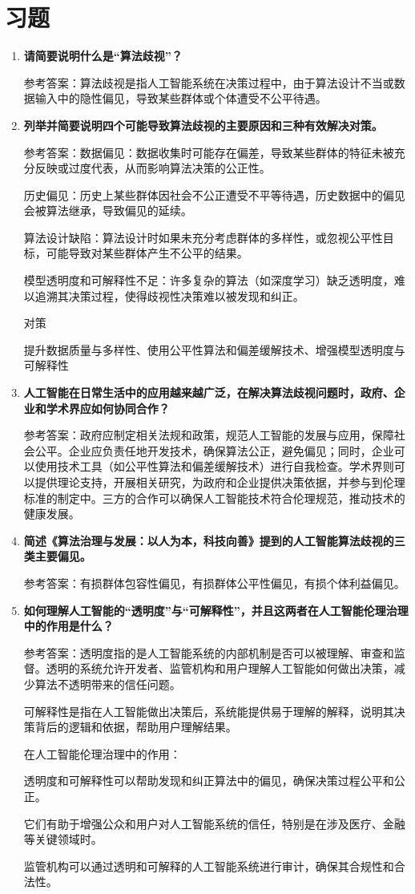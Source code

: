 \section*{习题}
\begin{enumerate}
\item \textbf{请简要说明什么是“算法歧视”？}

参考答案：算法歧视是指人工智能系统在决策过程中，由于算法设计不当或数据输入中的隐性偏见，导致某些群体或个体遭受不公平待遇。

\item \textbf{列举并简要说明四个可能导致算法歧视的主要原因和三种有效解决对策。}

参考答案：数据偏见：数据收集时可能存在偏差，导致某些群体的特征未被充分反映或过度代表，从而影响算法决策的公正性。

历史偏见：历史上某些群体因社会不公正遭受不平等待遇，历史数据中的偏见会被算法继承，导致偏见的延续。

算法设计缺陷：算法设计时如果未充分考虑群体的多样性，或忽视公平性目标，可能导致对某些群体产生不公平的结果。

模型透明度和可解释性不足：许多复杂的算法（如深度学习）缺乏透明度，难以追溯其决策过程，使得歧视性决策难以被发现和纠正。

对策

提升数据质量与多样性、使用公平性算法和偏差缓解技术、增强模型透明度与可解释性

\item \textbf{人工智能在日常生活中的应用越来越广泛，在解决算法歧视问题时，政府、企业和学术界应如何协同合作？}

参考答案：政府应制定相关法规和政策，规范人工智能的发展与应用，保障社会公平。企业应负责任地开发技术，确保算法公正，避免偏见；同时，企业可以使用技术工具（如公平性算法和偏差缓解技术）进行自我检查。学术界则可以提供理论支持，开展相关研究，为政府和企业提供决策依据，并参与到伦理标准的制定中。三方的合作可以确保人工智能技术符合伦理规范，推动技术的健康发展。

\item \textbf{简述《算法治理与发展：以人为本，科技向善》提到的人工智能算法歧视的三类主要偏见。}

参考答案：有损群体包容性偏见，有损群体公平性偏见，有损个体利益偏见。

\item \textbf{如何理解人工智能的“透明度”与“可解释性”，并且这两者在人工智能伦理治理中的作用是什么？}

参考答案：透明度指的是人工智能系统的内部机制是否可以被理解、审查和监督。透明的系统允许开发者、监管机构和用户理解人工智能如何做出决策，减少算法不透明带来的信任问题。

可解释性是指在人工智能做出决策后，系统能提供易于理解的解释，说明其决策背后的逻辑和依据，帮助用户理解结果。

在人工智能伦理治理中的作用：

透明度和可解释性可以帮助发现和纠正算法中的偏见，确保决策过程公平和公正。

它们有助于增强公众和用户对人工智能系统的信任，特别是在涉及医疗、金融等关键领域时。

监管机构可以通过透明和可解释的人工智能系统进行审计，确保其合规性和合法性。

\end{enumerate}